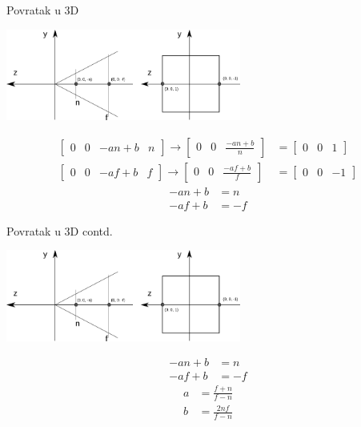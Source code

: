 \documentclass[9pt]{beamer}
\begin{document}
\begin{frame}{Povratak u 3D}
	\begin{center}
		\includegraphics[height=3cm]{slike/p04_07.png}
	\end{center}
	\begin{align*}
	\left[ \begin{array}{cccc}0 & 0 & -an+b & n \end{array} \right] \rightarrow
	\left[ \begin{array}{ccc}0 & 0 & \frac{-an+b}{n} \end{array} \right] &=  \left[ \begin{array}{ccc}0 & 0 & 1 \end{array} \right]  \\ 
	\left[ \begin{array}{cccc}0 & 0 & -af+b & f \end{array} \right] \rightarrow
	\left[ \begin{array}{ccc}0 & 0 & \frac{-af+b}{f} \end{array} \right] & = \left[ \begin{array}{ccc}0 & 0 & -1 \end{array} \right]
	\end{align*}
	\begin{align*}
	-an+b & = n \\
	-af+b & = -f 
	\end{align*}
\end{frame}

\begin{frame}{Povratak u 3D contd.}
	\begin{center}
		\includegraphics[height=3cm]{slike/p04_07.png}
	\end{center}
	\begin{align*}
	-an+b & = n \\
	-af+b & = -f 
	\end{align*}
	\begin{align*}
	a &= \frac{f+n}{f-n} \\
	b &= \frac{2nf}{f-n}
	\end{align*}
\end{frame}
\end{document}
